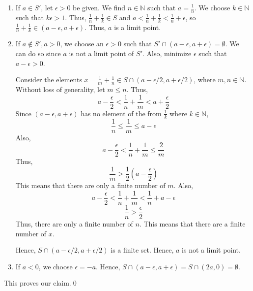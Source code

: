\documentclass[10pt]{article}
\begin{document}
\begin{enumerate}
\begin{enumerate}
                        \item If $a \in S'$, let $\epsilon > 0$ be given. We find $n \in \mathbb{N}$
                        such that $a = \frac{1}{n}$.
                        We choose $k \in \mathbb{N}$ such that $k\epsilon > 1$. Thus, $\frac{1}{n} + \frac{1}{k} \in S$ and 
                        $a < \frac{1}{n} + \frac{1}{k} < \frac{1}{n} + \epsilon$, so $\frac{1}{n} + \frac{1}{k} \in (a - \epsilon, a + \epsilon)$.
                        Thus, $a$ is a limit point.

                        \item If $a \notin S', a > 0$, we choose an $\epsilon > 0$ such that $S' \cap (a - \epsilon, a + \epsilon) = \emptyset$.
                        We can do so since $a$ is not a limit point of $S'$. Also, minimize $\epsilon$ such that $a - \epsilon > 0$.

                        Consider the elements $x = \frac{1}{m} + \frac{1}{n} \in S \cap (a - \epsilon/2, a + \epsilon/2)$, where $m, n \in \mathbb{N}$.
                        Without loss of generality, let $m \le n$. Thus,
                        \[
                        a - \frac{\epsilon}{2} < \frac{1}{n} + \frac{1}{m} < a + \frac{\epsilon}{2}
                        \]
                        Since $(a - \epsilon, a + \epsilon)$ has no element of the from $\frac{1}{k}$
                        where $k \in \mathbb{N}$,
                        \[
                        \frac{1}{n} \le \frac{1}{m} \le a - \epsilon
                        \]
                        Also,
                        \[
                        a - \frac{\epsilon}{2} < \frac{1}{n} + \frac{1}{m} \le \frac{2}{m}
                        \]
                        Thus,
                        \[
                        \frac{1}{m} > \frac{1}{2}(a - \frac{\epsilon}{2})
                        \]
                        This means that there are only a finite number of $m$.
                        Also,
                        \[
                        a - \frac{\epsilon}{2} < \frac{1}{n} + \frac{1}{m} < \frac{1}{n} + a - \epsilon
                        \]
                        \[
                        \frac{1}{n} > \frac{\epsilon}{2}
                        \]
                        Thus, there are only a finite number of $n$. This means that there are a finite number of $x$.

                        Hence, $S \cap (a - \epsilon/2, a + \epsilon/2)$ is a finite set.
                        Hence, $a$ is not a limit point.
                        
                        \item If $a < 0$, we choose $\epsilon = -a$. Hence, $S \cap (a - \epsilon, a + \epsilon) = 
                        S \cap (2a, 0) = \emptyset$.
                \end{enumerate}
                This proves our claim.\qed
        \end{enumerate}
\end{document}
